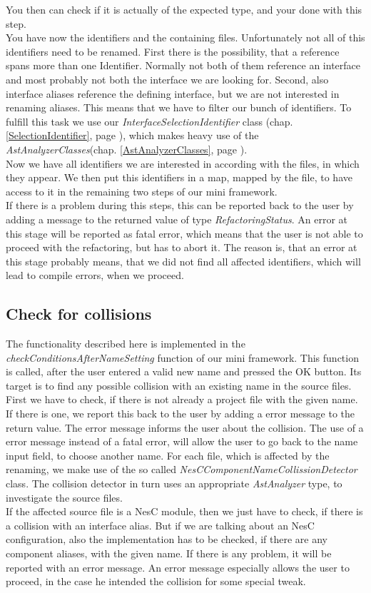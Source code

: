 \documentclass[a4paper,10pt]{report}
\begin{document}
You then can check if it is actually of the expected type, and your done with this step.\\
You have now the identifiers and the containing files. Unfortunately not all of this identifiers need to be renamed.
First there is the possibility, that a reference spans more than one Identifier.
Normally not both of them reference an interface and most probably not both the interface we are looking for. 
Second, also interface aliases reference the defining interface, but we are not interested in renaming aliases.
This means that we have to filter our bunch of identifiers.
To fulfill this task we use our {\it InterfaceSelectionIdentifier} class (chap. \ref{SelectionIdentifier}, page \pageref{SelectionIdentifier}), which makes heavy use of the {\it AstAnalyzerClasses}(chap. \ref{AstAnalyzerClasses}, page \pageref{AstAnalyzerClasses}).\\
Now we have all identifiers we are interested in according with the files, in which they appear. 
We then put this identifiers in a map, mapped by the file, to have access to it in the remaining two steps of our mini framework.\\
If there is a problem during this steps, this can be reported back to the user by adding a message to the returned value of type {\it RefactoringStatus}. 
An error at this stage will be reported as fatal error, which means that the user is not able to proceed with the refactoring, but has to abort it. 
The reason is, that an error at this stage probably means, that we did not find all affected identifiers, which will lead to compile errors, when we proceed.

\subsection{Check for collisions}
The functionality described here is implemented in the {\it checkConditionsAfterNameSetting} function of our mini framework.
This function is called, after the user entered a valid new name and pressed the OK button.
Its target is to find any possible collision with an existing name in the source files.
First we have to check, if there is not already a project file with the given name.
If there is one, we report this back to the user by adding a error message to the return value.
The error message informs the user about the collision.
The use of a error message instead of a fatal error, will allow the user to go back to the name input field, to choose another name. 
For each file, which is affected by the renaming, we make use of the so called {\it NesCComponentNameCollissionDetector} class. 
The collision detector in turn uses an appropriate {\it AstAnalyzer} type, to investigate the source files.\\
If the affected source file is a NesC module, then we just have to check, if there is a collision with an interface alias. 
But if we are talking about an NesC configuration, also the implementation has to be checked, if there are any component aliases, with the given name.
If there is any problem, it will be reported with an error message.
An error message especially allows the user to proceed, in the case he intended the collision for some special tweak.
 
\end{document}
